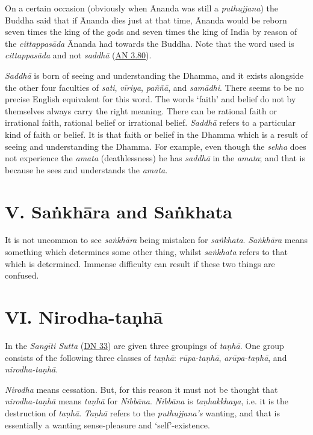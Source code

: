 On a certain occasion (obviously when Ānanda was still a \emph{puthujjana}) the Buddha said that if Ānanda dies just at that time, Ānanda would be reborn seven times the king of the gods and seven times the king of India by reason of the \emph{cittappasāda} Ānanda had towards the Buddha. Note that the word used is \emph{cittappasāda} and not \emph{saddhā} (\href{https://suttacentral.net/an3.80/en/sujato}{AN 3.80}).

\emph{Saddhā} is born of seeing and understanding the Dhamma, and it exists alongside the other four faculties of \emph{sati}, \emph{vīriya}, \emph{paññā}, and \emph{samādhi}. There seems to be no precise English equivalent for this word. The words `faith' and belief do not by themselves always carry the right meaning. There can be rational faith or irrational faith, rational belief or irrational belief. \emph{Saddhā} refers to a particular kind of faith or belief. It is that faith or belief in the Dhamma which is a result of seeing and understanding the Dhamma. For example, even though the \emph{sekha} does not experience the \emph{amata} (deathlessness) he has \emph{saddhā} in the \emph{amata}; and that is because he sees and understands the \emph{amata}.

\section{V. Saṅkhāra and Saṅkhata}

It is not uncommon to see \emph{saṅkhāra} being mistaken for \emph{saṅkhata}. \emph{Saṅkhāra} means something which determines some other thing, whilst \emph{saṅkhata} refers to that which is determined. Immense difficulty can result if these two things are confused.

\section{VI. Nirodha-taṇhā}

In the \emph{Sangīti Sutta} (\href{https://suttacentral.net/dn33/en/sujato}{DN 33}) are given three groupings of \emph{taṇhā}. One group consists of the following three classes of \emph{taṇhā}: \emph{rūpa-taṇhā}, \emph{arūpa-taṇhā}, and \emph{nirodha-taṇhā}.

\emph{Nirodha} means cessation. But, for this reason it must not be thought that \emph{nirodha-taṇhā} means \emph{taṇhā} for \emph{Nibbāna}. \emph{Nibbāna} is \emph{taṇhakkhaya}, i.e. it is the destruction of \emph{taṇhā}. \emph{Taṇhā} refers to the \emph{puthujjana's} wanting, and that is essentially a wanting sense-pleasure and `self'-existence.

